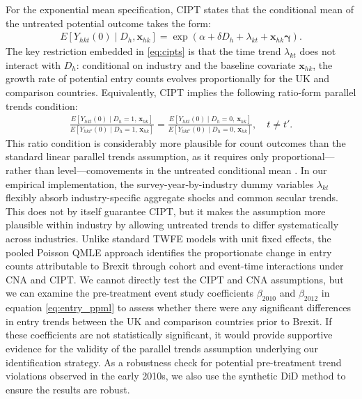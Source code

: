 \documentclass[preprint,11pt,authoryear]{elsarticle}
\begin{document}
For the exponential mean specification, CIPT states that the conditional mean of the untreated potential outcome takes the form:
\begin{align}\label{eq:cipts}
E[Y_{hkt}(0) \mid D_h, \mathbf{x}_{hk}] = \exp\!\left(\alpha + \delta D_h + \lambda_{kt} + \mathbf{x}_{hk}\boldsymbol{\gamma}\right).
\end{align}
The key restriction embedded in \eqref{eq:cipts} is that the time trend $\lambda_{kt}$ does not interact with $D_h$: conditional on industry and the baseline covariate $\mathbf{x}_{hk}$, the growth rate of potential entry counts evolves proportionally for the UK and comparison countries.
Equivalently, CIPT implies the following ratio-form parallel trends condition:
\begin{align}\label{eq:pt_ratio}
\frac{E[Y_{hkt}(0) \mid D_h=1,\, \mathbf{x}_{hk}]}{E[Y_{hkt'}(0) \mid D_h=1,\, \mathbf{x}_{hk}]}
=
\frac{E[Y_{hkt}(0) \mid D_h=0,\, \mathbf{x}_{hk}]}{E[Y_{hkt'}(0) \mid D_h=0,\, \mathbf{x}_{hk}]}, \quad t \neq t'.
\end{align}
This ratio condition is considerably more plausible for count outcomes than the standard linear parallel trends assumption, as it requires only proportional---rather than level---comovements in the untreated conditional mean \citep{wooldridge2023simple}. In our empirical implementation, the survey-year-by-industry dummy variables $\lambda_{kt}$ flexibly absorb industry-specific aggregate shocks and common secular trends. This does not by itself guarantee CIPT, but it makes the assumption more plausible within industry by allowing untreated trends to differ systematically across industries. Unlike standard TWFE models with unit fixed effects, the pooled Poisson QMLE approach identifies the proportionate change in entry counts attributable to Brexit through cohort and event-time interactions under CNA and CIPT.
We cannot directly test the CIPT and CNA assumptions, but we can examine the pre-treatment event study coefficients $\beta_{2010}$ and $\beta_{2012}$ in equation \eqref{eq:entry_ppml} to assess whether there were any significant differences in entry trends between the UK and comparison countries prior to Brexit. If these coefficients are not statistically significant, it would provide supportive evidence for the validity of the parallel trends assumption underlying our identification strategy.
As a robustness check for potential pre-treatment trend violations observed in the early 2010s, we also use the synthetic DiD method to ensure the results are robust.
\end{document}
